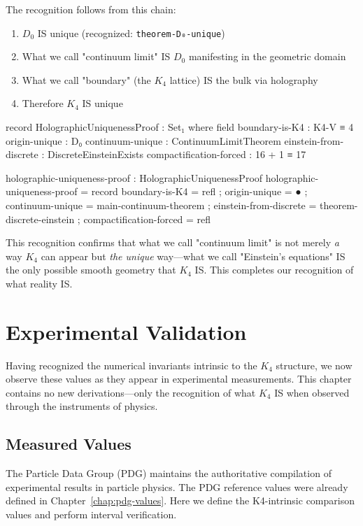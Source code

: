 \documentclass[11pt,a4paper]{book}
\begin{document}
The recognition follows from this chain:
\begin{enumerate}
\item $D_0$ IS unique (recognized: \texttt{theorem-D₀-unique})
\item What we call "continuum limit" IS $D_0$ manifesting in the geometric domain
\item What we call "boundary" (the $K_4$ lattice) IS the bulk via holography
\item Therefore $K_4$ IS unique
\end{enumerate}

\begin{code}
record HolographicUniquenessProof : Set₁ where
  field
    boundary-is-K4 : K4-V ≡ 4
    origin-unique : D₀
    continuum-unique : ContinuumLimitTheorem
    einstein-from-discrete : DiscreteEinsteinExists
    compactification-forced : 16 + 1 ≡ 17

holographic-uniqueness-proof : HolographicUniquenessProof
holographic-uniqueness-proof = record
  { boundary-is-K4 = refl
  ; origin-unique = ●
  ; continuum-unique = main-continuum-theorem
  ; einstein-from-discrete = theorem-discrete-einstein
  ; compactification-forced = refl
  }
\end{code}

This recognition confirms that what we call "continuum limit" is not merely \emph{a} way $K_4$ can appear but 
\emph{the unique} way---what we call "Einstein's equations" IS the only possible smooth geometry 
that $K_4$ IS. This completes our recognition of what reality IS.

\chapter{Experimental Validation}
\label{chap:validation}

Having recognized the numerical invariants intrinsic to the $K_4$ structure, we now observe these values as they appear in experimental measurements. This chapter contains no new derivations---only the recognition of what $K_4$ IS when observed through the instruments of physics.

\section{Measured Values}

The Particle Data Group (PDG) maintains the authoritative compilation of experimental results 
in particle physics. The PDG reference values were already defined in Chapter~\ref{chap:pdg-values}.
Here we define the K4-intrinsic comparison values and perform interval verification.
\end{document}
